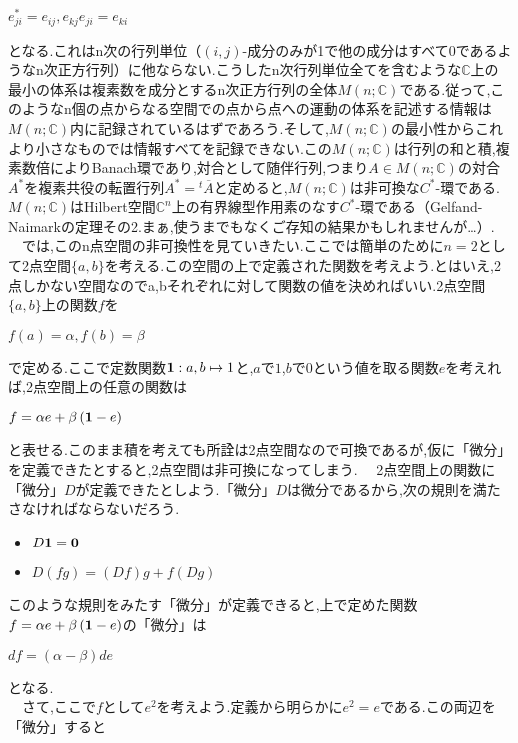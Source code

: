 \begin{center}
$e_{ji}^*=e_{ij},　e_{kj}e_{ji}=e_{ki}$
\end{center}
となる.これはn次の行列単位（$\left(i,j\right)$-成分のみが1で他の成分はすべて0であるようなn次正方行列）に他ならない.こうしたn次行列単位全てを含むような$\mathbb{C}$上の最小の体系は複素数を成分とするn次正方行列の全体$M\left(n;\mathbb{C}\right)$である.従って,このようなn個の点からなる空間での点から点への運動の体系を記述する情報は$M\left(n;\mathbb{C}\right)$内に記録されているはずであろう.そして,$M\left(n;\mathbb{C}\right)$の最小性からこれより小さなものでは情報すべてを記録できない.この$M\left(n;\mathbb{C}\right)$は行列の和と積,複素数倍によりBanach環であり,対合として随伴行列,つまり$A\in M\left(n;\mathbb{C}\right)$の対合$A^*$を複素共役の転置行列$A^*={}^{t}\overline{A}$と定めると,$M\left(n;\mathbb{C}\right)$は非可換な$C^*$-環である.$M\left(n;\mathbb{C}\right)$はHilbert空間$\mathbb{C}^n$上の有界線型作用素のなす$C^*$-環である（Gelfand-Naimarkの定理その2.まぁ,使うまでもなくご存知の結果かもしれませんが…）.
　では,このn点空間の非可換性を見ていきたい.ここでは簡単のために$n=2$として2点空間$\{a,b\}$を考える.この空間の上で定義された関数を考えよう.とはいえ,2点しかない空間なのでa,bそれぞれに対して関数の値を決めればいい.2点空間$\{a,b\}$上の関数$f$を
\begin{center}
$f\left(a\right)=\alpha,　f\left(b\right)=\beta$
\end{center}
で定める.ここで定数関数${\bf 1}:a,b\mapsto 1$と,$a$で$1$,$b$で$0$という値を取る関数$e$を考えれば,2点空間上の任意の関数は
\begin{center}
$f=\alpha e+\beta \left({\bf 1}-e\right)$
\end{center}
と表せる.このまま積を考えても所詮は2点空間なので可換であるが,仮に「微分」を定義できたとすると,2点空間は非可換になってしまう.
　2点空間上の関数に「微分」$D$が定義できたとしよう.「微分」$D$は微分であるから,次の規則を満たさなければならないだろう.
\begin{itemize}
\item$D{\bf 1}={\bf 0}$
\item$D\left(fg\right)=\left(Df\right)g+f\left(Dg\right)$
\end{itemize}
このような規則をみたす「微分」が定義できると,上で定めた関数$f=\alpha e+\beta \left({\bf 1}-e\right)$の「微分」は
\begin{center}
$df=\left(\alpha-\beta\right)de$
\end{center}
となる.\\
　さて,ここで$f$として$e^2$を考えよう.定義から明らかに$e^2=e$である.この両辺を「微分」すると

